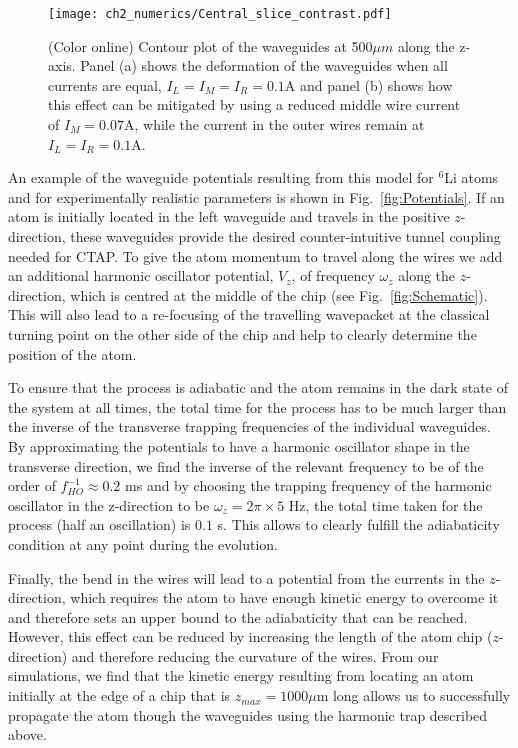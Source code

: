 \begin{figure}
  \texttt{[image: ch2\_numerics/Central\_slice\_contrast.pdf]}
  \caption{(Color online) Contour plot of the waveguides at 500$\mu m$ along the z-axis. Panel (a) shows the deformation of the waveguides when all currents are equal, $I_L=I_M=I_R=0.1$A and panel (b) shows how this effect can be mitigated by using a reduced middle wire current of $I_M=0.07$A, while the current in the outer wires remain at $I_L=I_R=0.1$A.}
  \label{fig:slice}
\end{figure}

An example of the waveguide potentials resulting from this model for $^6$Li  atoms and for experimentally realistic parameters is shown in Fig.~\ref{fig:Potentials}. If an atom is initially located in the left waveguide and travels in the positive $z$-direction, these waveguides provide the desired counter-intuitive tunnel coupling needed for CTAP. To give the atom momentum to travel along the wires we add an additional harmonic oscillator potential, $V_z$, of frequency $\omega_z$ along the $z$-direction, which is centred at the middle of the chip (see Fig.~\ref{fig:Schematic}). This will also lead to a re-focusing of the travelling wavepacket at the classical turning point on the other side of the chip and help to clearly determine the position of the atom.

To ensure that the process is adiabatic and the atom remains in the dark state of the system at all times, the total time for the process has to be much larger than the inverse of the transverse trapping frequencies of the individual waveguides. By approximating the potentials to have a harmonic oscillator shape in the transverse direction, we find the inverse of the relevant frequency to be of the order of $f_{HO} ^{-1}\approx 0.2$ ms and by choosing the trapping frequency of the harmonic oscillator in the z-direction to be $\omega_z=2 \pi \times 5$ Hz, the total time taken for the process (half an oscillation) is $0.1$ s. This allows to clearly fulfill the adiabaticity condition at any point during the evolution.

Finally, the bend in the wires will lead to a potential from the currents in the $z$-direction, which requires the atom to have enough kinetic energy to overcome it and therefore sets an upper bound to the adiabaticity that can be reached. However, this effect can be reduced by increasing the length of the atom chip ($z$-direction) and therefore reducing the curvature of the wires. From our simulations, we find that the kinetic energy resulting from locating an atom initially at the edge of a chip that is $z_{max}=1000 \mu$m long allows us to successfully propagate the atom though the waveguides using the harmonic trap described above.

